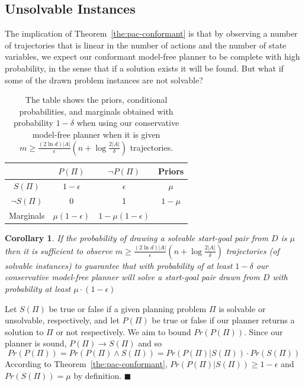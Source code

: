 \documentclass{article}
\newtheorem{corollary}{Corollary}
\newenvironment{proof}{\noindent{\bf Proof:~~}}{\qed}
\newcommand{\qed}{\hfill\ensuremath{\blacksquare}}
\newcommand{\solvable}{\textit{S}}
\newcommand{\plannable}{\textit{P}}
\begin{document}
	\subsection{Unsolvable Instances}
	
	The implication of Theorem~\ref{the:pac-conformant} is that by observing 
	a number of trajectories that is linear in the number of actions and the number of state variables, 
	we expect our conformant model-free planner to be complete with high probability, in the sense that if a solution exists it will be found. But what if some of the drawn problem instances are not solvable? 

\begin{table}
	\centering
	\begin{tabular}{c|c|c|c}
			& $\plannable (\Pi)$ & $\neg\plannable(\Pi)$ & Priors \\ \hline
		$\solvable(\Pi)$ 		& $1-\epsilon$ & $\epsilon$ & $\mu$ \\
		$\neg\solvable(\Pi)$	& 0 & 1 & $1-\mu$ \\ \hline
		Marginals	& $\mu (1-\epsilon)$ & $1-\mu(1-\epsilon)$ &
	\end{tabular}
\caption{The table shows the priors, conditional probabilities, and marginals obtained with probability $1-\delta$ when using our conservative model-free planner when it is given $m\geq\frac{(2\ln  d)|A|}{\epsilon}(n+\log\frac{2|A|}{\delta})$ trajectories.}
\label{tab:probabilities}	
\end{table}

	\begin{corollary}
		If the probability of drawing a solvable start-goal pair from $D$ is $\mu$ then it is sufficient to 
		observe $m\geq\frac{(2\ln  d)|A|}{\epsilon}(n+\log\frac{2|A|}{\delta})$
		trajectories (of solvable instances) to guarantee that with probability of at least $1-\delta$ our conservative model-free planner will solve a start-goal pair drawn from $D$ with probability at least $\mu\cdot(1-\epsilon)$ 
\label{cor:unsolvable}
	\end{corollary}
\begin{proof}
	Let $\solvable(\Pi)$ be true or false if  a given planning problem $\Pi$ is solvable or unsolvable, respectively, 
	and let $\plannable(\Pi)$ be true or false if our planner returns a solution to $\Pi$ or not respectively. We aim to bound $Pr(\plannable(\Pi))$. Since our planner is sound, $\plannable(\Pi)\rightarrow \solvable(\Pi)$ and so
	\[ Pr(\plannable(\Pi))= Pr(\plannable(\Pi)\wedge \solvable(\Pi))= Pr(\plannable(\Pi)|\solvable(\Pi))\cdot Pr(\solvable(\Pi)) \]
	According to Theorem~\ref{the:pac-conformant}, 
	$Pr(\plannable(\Pi)|\solvable(\Pi))\geq 1-\epsilon$ 
	and $Pr(\solvable(\Pi))=\mu$ by definition. 
\end{proof}
\end{document}
